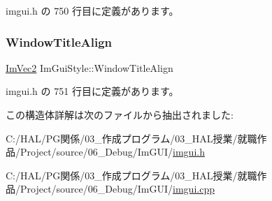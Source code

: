  imgui.\+h の 750 行目に定義があります。

\mbox{\label{struct_im_gui_style_a3fc57a15ab8f206045f1e5dfccd8b2e7}} 
\subsubsection{\texorpdfstring{Window\+Title\+Align}{WindowTitleAlign}}
{\footnotesize\ttfamily \mbox{\hyperlink{struct_im_vec2}{Im\+Vec2}} Im\+Gui\+Style\+::\+Window\+Title\+Align}



 imgui.\+h の 751 行目に定義があります。



この構造体詳解は次のファイルから抽出されました\+:\begin{DoxyCompactItemize}
\item 
C\+:/\+H\+A\+L/\+P\+G関係/03\+\_\+作成プログラム/03\+\_\+\+H\+A\+L授業/就職作品/\+Project/source/06\+\_\+\+Debug/\+Im\+G\+U\+I/\mbox{\hyperlink{imgui_8h}{imgui.\+h}}\item 
C\+:/\+H\+A\+L/\+P\+G関係/03\+\_\+作成プログラム/03\+\_\+\+H\+A\+L授業/就職作品/\+Project/source/06\+\_\+\+Debug/\+Im\+G\+U\+I/\mbox{\hyperlink{imgui_8cpp}{imgui.\+cpp}}\end{DoxyCompactItemize}

